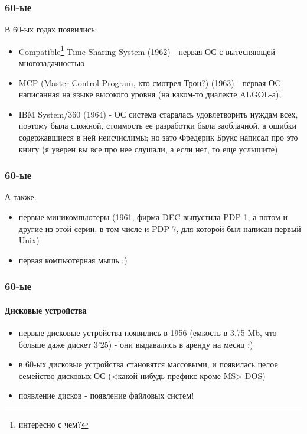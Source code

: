 \begin{frame}
\frametitle{60-ые}

В 60-ых годах появились:
\begin{itemize}
  \item Compatible\footnote{интересно с чем?} Time-Sharing System (1962) -
        первая ОС с вытесняющей многозадачностью
  \item MCP (Master Control Program, кто смотрел Трон?) (1963) - первая ОC
        написанная на языке высокого уровня (на каком-то диалекте ALGOL-а);
  \item IBM System/360 (1964) - ОС система старалась удовлетворить нуждам всех,
        поэтому была сложной, стоимость ее разработки была заоблачной, а ошибки
        содержавшиеся в ней неисчислимы; но зато Фредерик Брукс написал про это
        книгу (я уверен вы все про нее слушали, а если нет, то еще услышите)
\end{itemize}
\end{frame}

\begin{frame}
\frametitle{60-ые}

А также:
\begin{itemize}
  \item первые миникомпьютеры (1961, фирма DEC выпустила PDP-1, а потом и другие
        из этой серии, в том числе и PDP-7, для которой был написан первый Unix)
  \item первая компьютерная мышь :)
\end{itemize}
\end{frame}

\begin{frame}
\frametitle{60-ые}
\framesubtitle{Дисковые устройства}

\begin{itemize}
  \item первые дисковые устройства появились в 1956 (емкость в 3.75 Mb, что
        больше даже дискет 3'25) - они выдавались в аренду на месяц :)
  \item в 60-ых дисковые устройства становятся массовыми, и появилась целое
        семейство дисковых ОС (<какой-нибудь префикс кроме MS> DOS)
  \item появление дисков - появление файловых систем!
\end{itemize}
\end{frame}
